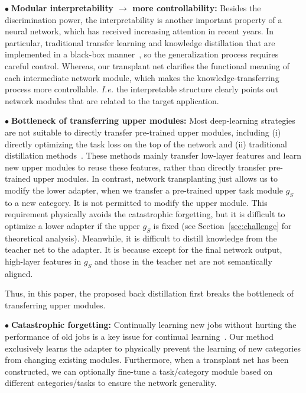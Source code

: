 \documentclass[10pt,twocolumn,letterpaper]{article}
\begin{document}
\noindent
$\bullet\;$\textbf{Modular interpretability $\rightarrow$ more controllability:} Besides the discrimination power, the interpretability is another important property of a neural network, which has received increasing attention in recent years. In particular, traditional transfer learning and knowledge distillation that are implemented in a black-box manner~\cite{ProgressiveNN,netMerger}, so the generalization process requires careful control. Whereas, our transplant net clarifies the functional meaning of each intermediate network module, which makes the knowledge-transferring process more controllable. \emph{I.e.} the interpretable structure clearly points out network modules that are related to the target application.

\noindent
$\bullet\;$\textbf{Bottleneck of transferring upper modules\textcolor{red}{\footnotemark[1]}:} Most deep-learning strategies are not suitable to directly transfer pre-trained upper modules, including (i) directly optimizing the task loss on the top of the network and (ii) traditional distillation methods~\cite{distill}. These methods mainly transfer low-layer features and learn new upper modules to reuse these features, rather than directly transfer pre-trained upper modules. In contrast, network transplanting just allows us to modify the lower adapter, when we transfer a pre-trained upper task module $g_{S}$ to a new category. It is not permitted to modify the upper module. This requirement physically avoids the catastrophic forgetting, but it is difficult to optimize a lower adapter if the upper $g_{S}$ is fixed (see Section~\ref{sec:challenge} for theoretical analysis). Meanwhile, it is difficult to distill knowledge from the teacher net to the adapter. It is because except for the final network output, high-layer features in $g_{S}$ and those in the teacher net are not semantically aligned.

Thus, in this paper, the proposed back distillation first breaks the bottleneck of transferring upper modules.

\noindent
$\bullet\;$\textbf{Catastrophic forgetting:} Continually learning new jobs without hurting the performance of old jobs is a key issue for continual learning~\cite{ProgressiveNN,continualLearning}. Our method exclusively learns the adapter to physically prevent the learning of new categories from changing existing modules. Furthermore, when a transplant net has been constructed, we can optionally fine-tune a task/category module based on different categories/tasks to ensure the network generality.
\end{document}
